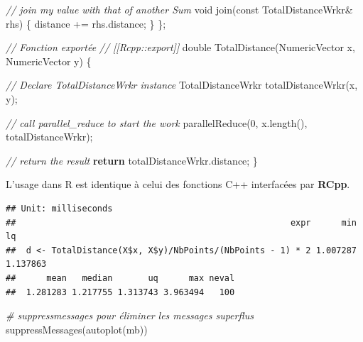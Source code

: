 \documentclass[
  11pt,
  french,
  a4paper,
  extrafontsizes,onecolumn,openright
  ]{memoir}
\newenvironment{Shaded}{\begin{snugshade}}{\end{snugshade}}
\newcommand{\AttributeTok}[1]{\textcolor[rgb]{0.77,0.63,0.00}{#1}}
\newcommand{\CommentTok}[1]{\textcolor[rgb]{0.56,0.35,0.01}{\textit{#1}}}
\newcommand{\ControlFlowTok}[1]{\textcolor[rgb]{0.13,0.29,0.53}{\textbf{#1}}}
\newcommand{\DataTypeTok}[1]{\textcolor[rgb]{0.13,0.29,0.53}{#1}}
\newcommand{\DecValTok}[1]{\textcolor[rgb]{0.00,0.00,0.81}{#1}}
\newcommand{\FunctionTok}[1]{\textcolor[rgb]{0.00,0.00,0.00}{#1}}
\newcommand{\NormalTok}[1]{#1}
\newcommand{\OtherTok}[1]{\textcolor[rgb]{0.56,0.35,0.01}{#1}}
\newcommand{\SpecialCharTok}[1]{\textcolor[rgb]{0.00,0.00,0.00}{#1}}
\begin{document}
\begin{Shaded}
\begin{Highlighting}[]
  \CommentTok{// join my value with that of another Sum}
  \DataTypeTok{void}\NormalTok{ join(}\AttributeTok{const}\NormalTok{ TotalDistanceWrkr\& rhs) \{ }
\NormalTok{    distance += rhs.distance; }
\NormalTok{  \}}
\NormalTok{\};}


\CommentTok{// Fonction exportée}
\CommentTok{// [[Rcpp::export]]}
\DataTypeTok{double}\NormalTok{ TotalDistance(NumericVector x, NumericVector y) \{}
  
  \CommentTok{// Declare TotalDistanceWrkr instance}
\NormalTok{  TotalDistanceWrkr totalDistanceWrkr(x, y);}
  
  \CommentTok{// call parallel\_reduce to start the work}
\NormalTok{  parallelReduce(}\DecValTok{0}\NormalTok{, x.length(), totalDistanceWrkr);}
  
  \CommentTok{// return the result}
  \ControlFlowTok{return}\NormalTok{ totalDistanceWrkr.distance;}
\NormalTok{\}}
\end{Highlighting}
\end{Shaded}

\normalsize

L'usage dans R est identique à celui des fonctions C++ interfacées par \textbf{RCpp}.

\scriptsize

\begin{Shaded}
\end{Shaded}

\begin{verbatim}
## Unit: milliseconds
##                                                      expr      min       lq
##  d <- TotalDistance(X$x, X$y)/NbPoints/(NbPoints - 1) * 2 1.007287 1.137863
##      mean   median       uq      max neval
##  1.281283 1.217755 1.313743 3.963494   100
\end{verbatim}

\begin{Shaded}
\begin{Highlighting}[]
\CommentTok{\# suppressmessages pour éliminer les messages superflus}
\FunctionTok{suppressMessages}\NormalTok{(}\FunctionTok{autoplot}\NormalTok{(mb))}
\end{Highlighting}
\end{Shaded}
\end{document}
